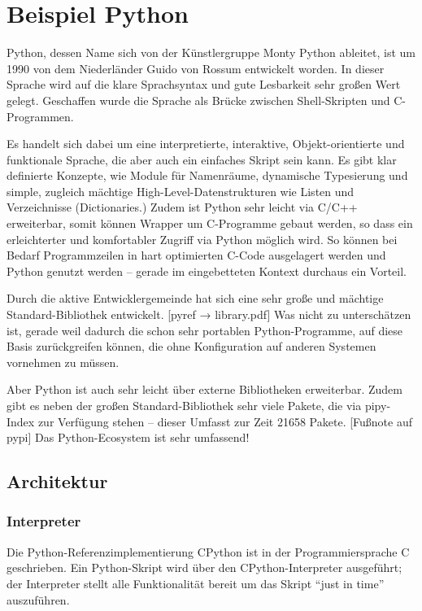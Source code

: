 \section{Beispiel Python}


Python, dessen Name sich von der Künstlergruppe Monty Python ableitet, ist um
1990 von dem Niederländer Guido von Rossum entwickelt worden. In dieser
Sprache wird auf die klare Sprachsyntax und gute Lesbarkeit sehr großen Wert
gelegt. Geschaffen wurde die Sprache als Brücke zwischen Shell-Skripten und
C-Programmen.

Es handelt sich dabei um eine interpretierte, interaktive, Objekt-orientierte
und funktionale Sprache, die aber auch ein einfaches Skript sein kann. Es gibt
klar definierte Konzepte, wie Module für Namenräume, dynamische Typesierung
und simple, zugleich mächtige High-Level-Datenstrukturen wie Listen und
Verzeichnisse (Dictionaries.) Zudem ist Python sehr leicht via C/C++
erweiterbar, somit können Wrapper um C-Programme gebaut werden, so dass ein
erleichterter und komfortabler Zugriff via Python möglich wird. So können bei
Bedarf Programmzeilen in hart optimierten C-Code ausgelagert werden und Python
genutzt werden -- gerade im eingebetteten Kontext durchaus ein Vorteil.

Durch die aktive Entwicklergemeinde hat sich eine sehr große und mächtige
Standard-Bibliothek entwickelt. [pyref → library.pdf] Was nicht zu
unterschätzen ist, gerade weil dadurch die schon sehr portablen
Python-Programme, auf diese Basis zurückgreifen können, die ohne Konfiguration
auf anderen Systemen vornehmen zu müssen.

Aber Python ist auch sehr leicht über externe Bibliotheken erweiterbar.
Zudem gibt es neben der großen Standard-Bibliothek sehr viele Pakete, die via
pipy-Index zur Verfügung stehen -- dieser Umfasst zur Zeit 21658 Pakete.
[Fußnote auf pypi] Das Python-Ecosystem ist sehr umfassend!


\subsection{Architektur}


\subsubsection{Interpreter}


Die Python-Referenzimplementierung CPython ist in der Programmiersprache C
geschrieben. Ein Python-Skript wird über den CPython-Interpreter ausgeführt;
der Interpreter stellt alle Funktionalität bereit um das Skript “just in time”
auszuführen.

